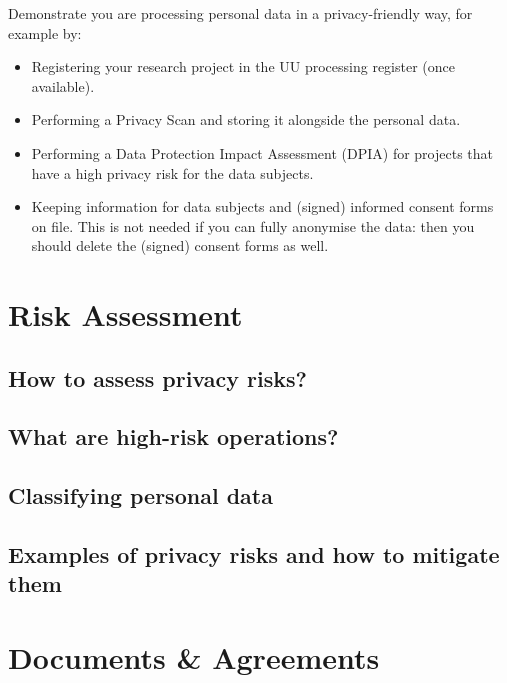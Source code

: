 \documentclass[
]{book}
\providecommand{\tightlist}{%
  \setlength{\itemsep}{0pt}\setlength{\parskip}{0pt}}
\begin{document}
Demonstrate you are processing personal data in a privacy-friendly way, for
example by:

\begin{itemize}
\tightlist
\item
  Registering your research project in the UU processing register (once available).
\item
  Performing a Privacy Scan and storing it
  alongside the personal data.
\item
  Performing a Data Protection Impact Assessment (DPIA) for
  projects that have a high privacy risk for the data subjects.
\item
  Keeping information for data subjects and (signed) informed consent forms on
  file. This is not needed if you can fully anonymise the data: then you should
  delete the (signed) consent forms as well.
\end{itemize}

\hypertarget{risk-assessment}{%
\chapter{Risk Assessment}\label{risk-assessment}}

\hypertarget{risk-assessment-how}{%
\section{How to assess privacy risks?}\label{risk-assessment-how}}

\hypertarget{high-risk-processing}{%
\section{What are high-risk operations?}\label{high-risk-processing}}

\hypertarget{data-classification}{%
\section{Classifying personal data}\label{data-classification}}

\hypertarget{example-risks}{%
\section{Examples of privacy risks and how to mitigate them}\label{example-risks}}

\hypertarget{legal-documents}{%
\chapter{Documents \& Agreements}\label{legal-documents}}
\end{document}
